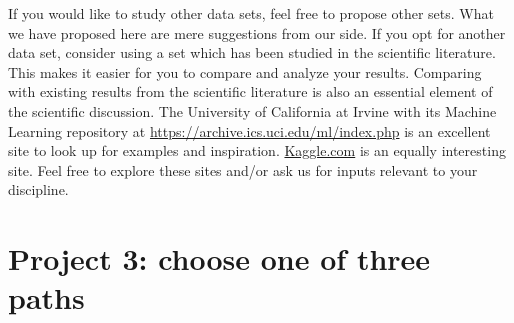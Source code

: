 \documentclass[11pt,a4paper]{article}
\begin{document}
If you would like to study other data sets, feel free to propose other sets.
What we have proposed here are mere suggestions from our side.  If you opt for
another data set, consider using a set which has been studied in the
scientific literature.  This makes it easier for you to compare and analyze
your results.  Comparing with existing results from the scientific literature
is also an essential element of the scientific discussion.  The University of
California at Irvine with its Machine Learning repository at
\url{https://archive.ics.uci.edu/ml/index.php} is an excellent site to look up
for examples and inspiration.  \href{https://www.kaggle.com/}{Kaggle.com} is
an equally interesting site.  Feel free to explore these sites and/or ask us
for inputs relevant to your discipline.

\section*{Project 3: choose one of three paths}
\end{document}
